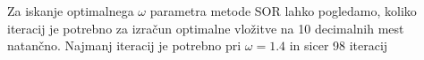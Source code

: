 \documentclass[12pt,a4paper]{article}
\begin{document}
Za iskanje optimalnega $\omega$ parametra metode SOR lahko pogledamo, koliko iteracij je potrebno za izračun optimalne vložitve na 10 decimalnih mest natančno. Najmanj iteracij je potrebno pri $\omega = 1.4$ in sicer 98 iteracij


\begin{verbatim}
\end{verbatim}
\end{document}

